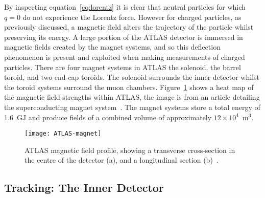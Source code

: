 By inspecting equation~\ref{eq:lorentz} it is clear that neutral particles for
which $q=0$ do not experience the Lorentz force. However for charged particles,
as previously discussed, a magnetic field alters the trajectory of the particle
whilst preserving its energy. A large portion of the ATLAS detector is immersed
in magnetic fields created by the magnet systems, and so this deflection
phenomenon is present and exploited when making measurements of charged
particles. There are four magnet systems in ATLAS the solenoid, the barrel
toroid, and two end-cap toroids. The solenoid surrounds the inner detector
whilst the toroid systems surround the muon chambers.
Figure~\ref{fig:ATLAS-magnets} shows a heat map of the magnetic field strengths
within ATLAS, the image is from an article detailing the superconducting magnet
system~\cite{ATLAS-magnets}. The magnet systems store a total energy of 1.6~GJ
and produce fields of a combined volume of approximately $12\times 10^4$~m$^3$.
\begin{figure}[ht]
  \centering
  \texttt{[image: ATLAS-magnet]}
  \caption[ATLAS magnetic field]{ATLAS magnetic field profile, showing a
    transverse cross-section in the centre of the detector (a), and a
    longitudinal section (b)~\cite{ATLAS-magnets}.}%
  \label{fig:ATLAS-magnets}
\end{figure}

\subsection{Tracking: The Inner Detector}%
\label{sec:id}

